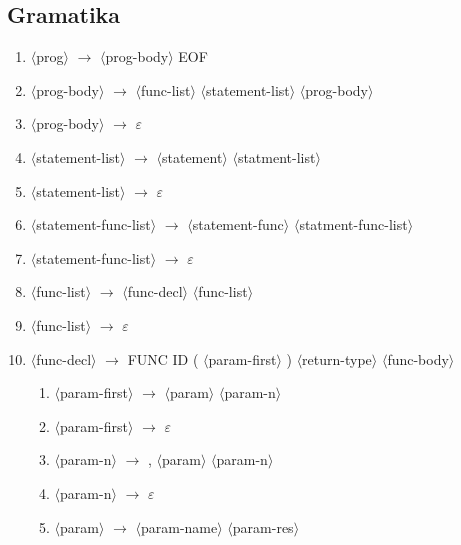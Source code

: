 \documentclass[11pt]{article}
\newcommand{\red}[1]{{\color{red} #1}}
\begin{document}
\subsection{Gramatika}
\begin{enumerate}[label=\arabic*., ref=\arabic*]
    \item $\langle$prog$\rangle$ $\rightarrow$ $\langle$prog-body$\rangle$ \red{EOF}
    \item $\langle$prog-body$\rangle$ $\rightarrow$ $\langle$func-list$\rangle$ $\langle$statement-list$\rangle$ $\langle$prog-body$\rangle$
    \item $\langle$prog-body$\rangle$ $\rightarrow$ \red{\red{$\varepsilon$}}
    \item $\langle$statement-list$\rangle$ $\rightarrow$ $\langle$statement$\rangle$ $\langle$statment-list$\rangle$
    \item $\langle$statement-list$\rangle$ $\rightarrow$ \red{$\varepsilon$}
    \item $\langle$statement-func-list$\rangle$ $\rightarrow$ $\langle$statement-func$\rangle$ $\langle$statment-func-list$\rangle$
    \item $\langle$statement-func-list$\rangle$ $\rightarrow$ \red{$\varepsilon$}
    \item $\langle$func-list$\rangle$ $\rightarrow$ $\langle$func-decl$\rangle$ $\langle$func-list$\rangle$
    \item $\langle$func-list$\rangle$ $\rightarrow$ \red{$\varepsilon$}
    \item  $\langle$func-decl$\rangle$ $\rightarrow$ \red{FUNC ID (} $\langle$param-first$\rangle$ \red{)} $\langle$return-type$\rangle$ $\langle$func-body$\rangle$
    \begin{enumerate}[label=\arabic{enumi}.\arabic*., ref=\arabic{enumi}\arabic*]
        \item $\langle$param-first$\rangle$ $\rightarrow$ $\langle$param$\rangle$ $\langle$param-n$\rangle$
        \item $\langle$param-first$\rangle$ $\rightarrow$ \red{$\varepsilon$}
        \item $\langle$param-n$\rangle$ $\rightarrow$ \red{,} $\langle$param$\rangle$ $\langle$param-n$\rangle$
        \item $\langle$param-n$\rangle$ $\rightarrow$ \red{$\varepsilon$}
        \item $\langle$param$\rangle$ $\rightarrow$ $\langle$param-name$\rangle$ $\langle$param-res$\rangle$ 
        \begin{enumerate}[label=\arabic{enumi}.\arabic{enumi}.\arabic*., ref=\arabic{enumi}.\arabic{enumi}.\arabic*]

\end{enumerate}
\end{enumerate}
\end{enumerate}
\end{document}
